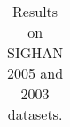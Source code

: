 \begin{table}
\begin{small}
\begin{tabular}{ l | l | c | c | c | c | c   }
\end{tabular} 
\caption{Results on SIGHAN 2005 and 2003 datasets. }\label{tbl:results}
\end{small}
\end{table}

